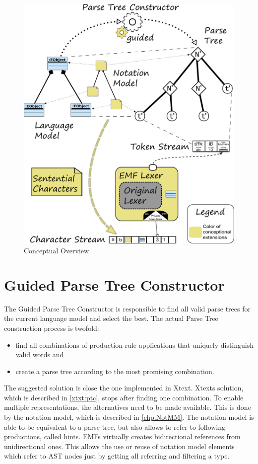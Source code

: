 \begin{figure}
\centering
\includegraphics[scale=0.75]{gfx/ex/Concept} 
\caption{Conceptual Overview}
\label{ConceptFigure}
\end{figure}










\section{Guided Parse Tree Constructor}
The Guided Parse Tree Constructor is responsible to find all valid parse trees for the current language model and select the best. The actual Parse Tree construction process is twofold:
\begin{itemize}
	\item find all combinations of production rule applications that uniquely distinguish valid words and
	\item create a parse tree according to the most promising combination. 
\end{itemize}
 
The suggested solution is close the one implemented in Xtext. Xtexts solution, which is described in \ref{xtxt:ptc}, stops after finding one combination. 
To enable multiple representations, the alternatives need to be made available. This is done by the notation model, which is described in \ref{chp:NotMM}. The notation model is able to be equivalent to a parse tree, but also allows to refer to following productions, called hints. EMFs  virtually creates bidirectional references from unidirectional ones. This allows the use or reuse of notation model elements which refer to AST nodes just by getting all referring  and filtering a type.

